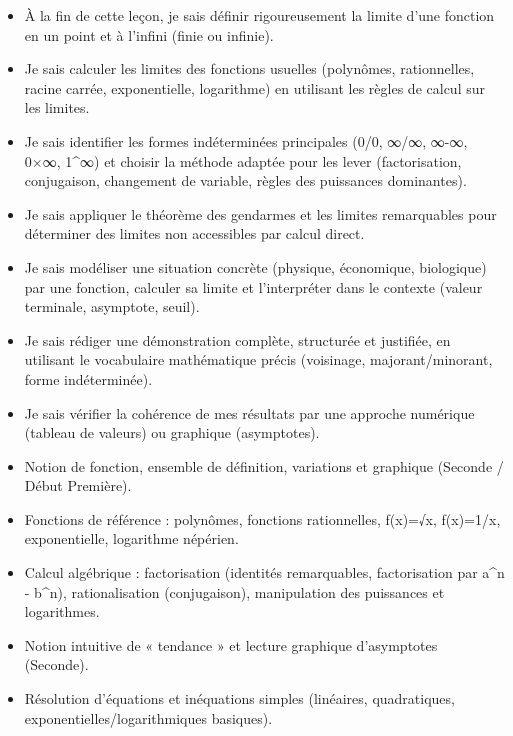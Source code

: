 \documentclass[11pt]{article}
\begin{document}
\begin{objectifs}
\begin{itemize}
\item À la fin de cette leçon, je sais définir rigoureusement la limite d'une fonction en un point et à l'infini (finie ou infinie).
\item Je sais calculer les limites des fonctions usuelles (polynômes, rationnelles, racine carrée, exponentielle, logarithme) en utilisant les règles de calcul sur les limites.
\item Je sais identifier les formes indéterminées principales (0/0, ∞/∞, ∞-∞, 0×∞, 1\^{}∞) et choisir la méthode adaptée pour les lever (factorisation, conjugaison, changement de variable, règles des puissances dominantes).
\item Je sais appliquer le théorème des gendarmes et les limites remarquables pour déterminer des limites non accessibles par calcul direct.
\item Je sais modéliser une situation concrète (physique, économique, biologique) par une fonction, calculer sa limite et l'interpréter dans le contexte (valeur terminale, asymptote, seuil).
\item Je sais rédiger une démonstration complète, structurée et justifiée, en utilisant le vocabulaire mathématique précis (voisinage, majorant/minorant, forme indéterminée).
\item Je sais vérifier la cohérence de mes résultats par une approche numérique (tableau de valeurs) ou graphique (asymptotes).
\end{itemize}
\end{objectifs}

\begin{prerequis}
\begin{itemize}
\item Notion de fonction, ensemble de définition, variations et graphique (Seconde / Début Première).
\item Fonctions de référence : polynômes, fonctions rationnelles, f(x)=√x, f(x)=1/x, exponentielle, logarithme népérien.
\item Calcul algébrique : factorisation (identités remarquables, factorisation par a\^{}n - b\^{}n), rationalisation (conjugaison), manipulation des puissances et logarithmes.
\item Notion intuitive de « tendance » et lecture graphique d'asymptotes (Seconde).
\item Résolution d'équations et inéquations simples (linéaires, quadratiques, exponentielles/logarithmiques basiques).
\end{itemize}
\end{prerequis}
\end{document}
